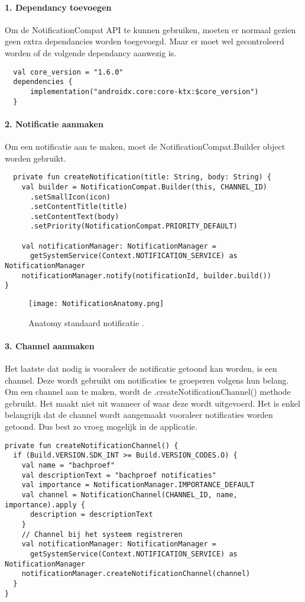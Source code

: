\paragraph{1. Dependancy toevoegen}
Om de NotificationCompat API te kunnen gebruiken, moeten er normaal gezien geen extra dependancies worden toegevoegd.
Maar er moet wel gecontroleerd worden of de volgende dependancy aanwezig is.
\begin{verbatim}
  val core_version = "1.6.0"
  dependencies {
      implementation("androidx.core:core-ktx:$core_version")
  }
\end{verbatim}

\paragraph{2. Notificatie aanmaken}
Om een notificatie aan te maken, moet de NotificationCompat.Builder object worden gebruikt. 
\begin{verbatim}
  private fun createNotification(title: String, body: String) {
    val builder = NotificationCompat.Builder(this, CHANNEL_ID)
      .setSmallIcon(icon)
      .setContentTitle(title)
      .setContentText(body)
      .setPriority(NotificationCompat.PRIORITY_DEFAULT)

    val notificationManager: NotificationManager =
      getSystemService(Context.NOTIFICATION_SERVICE) as NotificationManager
    notificationManager.notify(notificationId, builder.build())
}
\end{verbatim}
\begin{figure}[H]
    \centering
    \texttt{[image: NotificationAnatomy.png]}
    \caption{Anatomy standaard notificatie \parencite{One2020}.}
\end{figure}

\paragraph{3. Channel aanmaken}
Het laatste dat nodig is vooraleer de notificatie getoond kan worden, is een channel. Deze wordt 
gebruikt om notificaties te groeperen volgens hun belang. Om een channel aan te maken, wordt  
de .createNotificationChannel() methode gebruikt. Het maakt niet uit wanneer of waar deze wordt uitgevoerd. 
Het is enkel belangrijk dat de channel wordt aangemaakt vooraleer notificaties 
worden getoond. Dus best zo vroeg mogelijk in de applicatie.
\begin{verbatim}
private fun createNotificationChannel() {
  if (Build.VERSION.SDK_INT >= Build.VERSION_CODES.O) {
    val name = "bachproef"
    val descriptionText = "bachproef notificaties"
    val importance = NotificationManager.IMPORTANCE_DEFAULT
    val channel = NotificationChannel(CHANNEL_ID, name, importance).apply {
      description = descriptionText
    }
    // Channel bij het systeem registreren
    val notificationManager: NotificationManager =
      getSystemService(Context.NOTIFICATION_SERVICE) as NotificationManager
    notificationManager.createNotificationChannel(channel)
  }
}
\end{verbatim}

